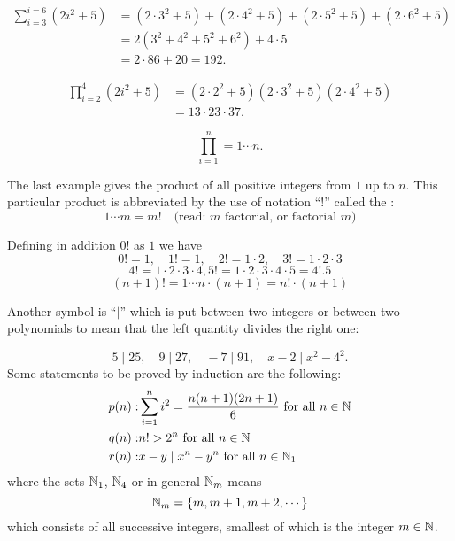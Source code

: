 \documentclass[11pt]{amsbook}
\begin{document}
\begin{exmp} \
	\begin{hEnumerateArabic}
	
		\item
		\begin{align*}
			\sum_{i = 3}^{i = 6} (2i^{2} + 5) 
			&=(2 \cdot 3^{2} + 5) 
			+ (2 \cdot 4^{2} + 5) 
			+ (2 \cdot 5^{2} + 5) 
			+ (2 \cdot 6^{2} + 5)\\
			&= 2(3^{2} + 4^{2} + 5^{2} + 6^{2}) + 4 \cdot 5 \\ 
			&= 2 \cdot 86 + 20 = 192.
		\end{align*}
	
		\item
		\begin{align*} 
			\prod_{i = 2}^{4} (2 i^{2} + 5) 
			&= (2 \cdot 2^{2} + 5)
		  	(2 \cdot 3^{2} + 5)
		  	(2 \cdot 4^{2} + 5)\\
			&=13 \cdot 23 \cdot 37.
		\end{align*}							   
	
		\item  
		\[
			\prod_{i = 1}^{n} 
			= 1 \cdots n.
		\]
	\end{hEnumerateArabic}
\end{exmp}

The last example gives the product of all positive integers 
from $1$ up to $n$. 
This particular product is abbreviated by 
the use of notation ``$!$'' called the 
:
\[
	1 \cdots m = m! 
	\quad
	\text{(read: $m$ factorial, or factorial $m$)}
\]

Defining in addition $0!$ as $1$ we have
\[
	0! = 1, \quad 
	1! = 1, \quad
	2! = 1 \cdot 2, \quad
	3! = 1 \cdot 2 \cdot 3
\]
\[
	4! = 1 \cdot 2 \cdot 3 \cdot 4,  
	5! = 1 \cdot 2 \cdot 3 \cdot 4 \cdot 5 = 4!.5
\]
\[
	(n + 1)! = 1 \cdots n \cdot (n + 1) 
	= n! \cdot (n + 1)
\]

Another symbol is ``$\mid$'' 
which is put between two integers or between two polynomials 
to mean that the left quantity divides the right one:

\[
	5 \mid 25, \quad
	9 \mid 27, \quad
	-7 \mid 91, \quad
	x-2 \mid x^{2} - 4^{2}.
\]
Some statements to be proved by induction are the following:
\begin{align*}
	p(n):  
		&\sum_{i=1}^{n} i^{2} 
		=\frac{ n(n + 1)(2n + 1)}{6}
		\text{ for all }
		n \in \mathbb{N}\\
	q(n):
		&n! > 2^{n} 
		\text{ for all }
		n \in \mathbb{N}\\
	r(n):
		&x - y \mid x^{n} - y^{n}
		\text{ for all }
		n \in \mathbb{N}_{1}
\end{align*}
where the sets 
$\mathbb{N}_{1}$, 
$\mathbb{N}_{4}$ or in general 
$\mathbb{N}_{m}$ means
\[
	\mathbb{N}_{m} 
	= \{ m, m + 1, m + 2, \cdots \}
\]
which consists of all successive integers, 
smallest of which is the integer $m \in \mathbb{N}$.
\end{document}
